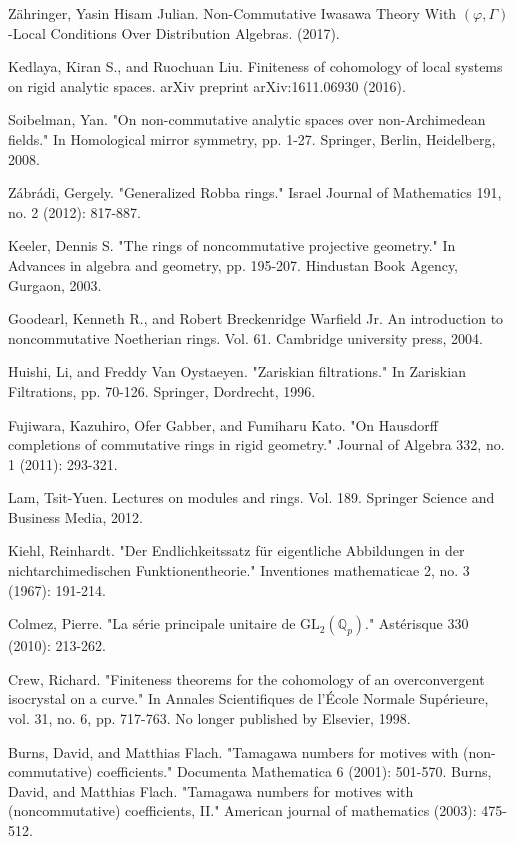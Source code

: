 \documentclass[12pt]{amsart}
\theoremstyle{definition}
\numberwithin{equation}{section}
\begin{document}
\begin{thebibliography}{10}
 Z\"ahringer, Yasin Hisam Julian. Non-Commutative Iwasawa Theory With $(\varphi,\Gamma)$-Local Conditions Over Distribution Algebras. (2017).



 Kedlaya, Kiran S., and Ruochuan Liu. Finiteness of cohomology of local systems on rigid analytic spaces. arXiv preprint arXiv:1611.06930 (2016).

 Soibelman, Yan. "On non-commutative analytic spaces over non-Archimedean fields." In Homological mirror symmetry, pp. 1-27. Springer, Berlin, Heidelberg, 2008.


 Z\'abr\'adi, Gergely. "Generalized Robba rings." Israel Journal of Mathematics 191, no. 2 (2012): 817-887.

 Keeler, Dennis S. "The rings of noncommutative projective geometry." In Advances in algebra and geometry, pp. 195-207. Hindustan Book Agency, Gurgaon, 2003.

 Goodearl, Kenneth R., and Robert Breckenridge Warfield Jr. An introduction to noncommutative Noetherian rings. Vol. 61. Cambridge university press, 2004.

 Huishi, Li, and Freddy Van Oystaeyen. "Zariskian filtrations." In Zariskian Filtrations, pp. 70-126. Springer, Dordrecht, 1996.

 Fujiwara, Kazuhiro, Ofer Gabber, and Fumiharu Kato. "On Hausdorff completions of commutative rings in rigid geometry." Journal of Algebra 332, no. 1 (2011): 293-321. 

 Lam, Tsit-Yuen. Lectures on modules and rings. Vol. 189. Springer Science and Business Media, 2012.

 Kiehl, Reinhardt. "Der Endlichkeitssatz f\"ur eigentliche Abbildungen in der nichtarchimedischen Funktionentheorie." Inventiones mathematicae 2, no. 3 (1967): 191-214.


 Colmez, Pierre. "La s\'erie principale unitaire de $\mathrm{GL}_2(\mathbb{Q}_p)$." Ast\'erisque 330 (2010): 213-262.

 Crew, Richard. "Finiteness theorems for the cohomology of an overconvergent isocrystal on a curve." In Annales Scientifiques de l'\'Ecole Normale Sup\'erieure, vol. 31, no. 6, pp. 717-763. No longer published by Elsevier, 1998.

 Burns, David, and Matthias Flach. "Tamagawa numbers for motives with (non-commutative) coefficients." Documenta Mathematica 6 (2001): 501-570.
 Burns, David, and Matthias Flach. "Tamagawa numbers for motives with (noncommutative) coefficients, II." American journal of mathematics (2003): 475-512.


\end{thebibliography}
\end{document}
